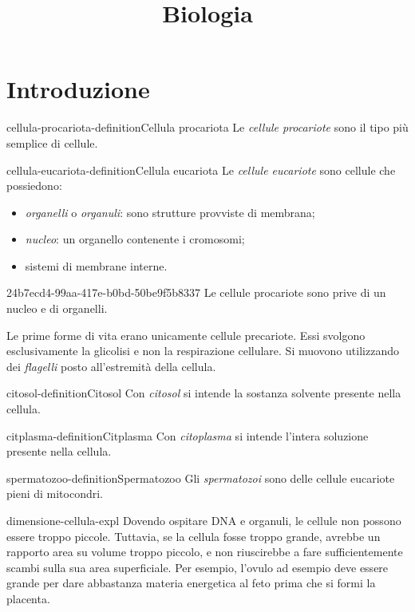 \documentclass[preview]{standalone}
\begin{document}
\title{Biologia}
\genpage

\section{Introduzione}

\begin{snippetdefinition}{cellula-procariota-definition}{Cellula procariota}
    Le \textit{cellule procariote} sono il tipo più semplice di cellule.
\end{snippetdefinition}

\begin{snippetdefinition}{cellula-eucariota-definition}{Cellula eucariota}
    Le \textit{cellule eucariote} sono cellule
    che possiedono:
    \begin{itemize}
        \item \textit{organelli} o \textit{organuli}: sono strutture provviste di membrana;
        \item \textit{nucleo}: un organello contenente i cromosomi;
        \item sistemi di membrane interne.
    \end{itemize}
\end{snippetdefinition}

\begin{snippet}{24b7ecd4-99aa-417e-b0bd-50be9f5b8337}
    Le cellule procariote sono prive di un nucleo e di organelli.

    Le prime forme di vita erano unicamente cellule precariote.
    Essi svolgono esclusivamente la glicolisi e non la respirazione cellulare.
    Si muovono utilizzando dei \textit{flagelli} posto all'estremità della cellula.
\end{snippet}


\begin{snippetdefinition}{citosol-definition}{Citosol}
    Con \textit{citosol} si intende la sostanza solvente presente nella cellula.
\end{snippetdefinition}

\begin{snippetdefinition}{citplasma-definition}{Citplasma}
    Con \textit{citoplasma} si intende l'intera soluzione presente nella cellula.
\end{snippetdefinition}

\begin{snippetdefinition}{spermatozoo-definition}{Spermatozoo}
    Gli \textit{spermatozoi} sono delle cellule eucariote pieni di mitocondri.
\end{snippetdefinition}

\begin{snippet}{dimensione-cellula-expl}
    Dovendo ospitare DNA e organuli, le cellule non possono essere troppo piccole.
    Tuttavia, se la cellula fosse troppo grande, avrebbe un rapporto area su volume troppo piccolo, e non riuscirebbe
    a fare sufficientemente scambi sulla sua area superficiale.
    Per esempio, l'ovulo ad esempio deve essere grande per dare
    abbastanza materia energetica al feto prima che si
    formi la placenta.
\end{snippet}
\end{document}

